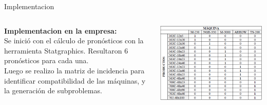\documentclass{beamer}
\begin{document}
\begin{frame}{Implementacion}
  \begin{columns}
    \begin{column}{0.55\textwidth}
      \textbf{Implementacion en la empresa:} \\
      Se inició con el cálculo de pronósticos con la herramienta Statgraphics. Resultaron 6 pronósticos para cada una.\\
      Luego se realizo la matriz de incidencia para identificar compatibilidad de las máquinas, y la generación de subproblemas.
    \end{column}
    \begin{column}{0.45\textwidth}
      \includegraphics[width=\linewidth]{Captura de pantalla 2025-05-07 012246.png}
    \end{column}
  \end{columns}
\end{frame}
\end{document}
